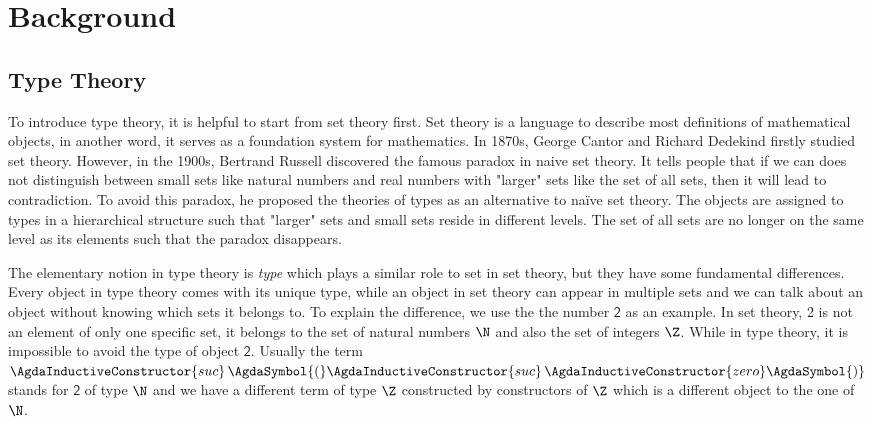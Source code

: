 \chapter{Background}
\label{tt}


\section{Type Theory}


To introduce type theory, it is helpful to start from set theory first. Set theory is a language to describe most definitions of mathematical objects, in another word, it serves as a foundation system for mathematics. 
In 1870s, George Cantor and Richard Dedekind firstly studied set theory. However, in the 1900s, Bertrand Russell discovered the famous paradox in naive set
theory. It tells people that if we can does not distinguish between small sets like natural numbers and real numbers with "larger" sets like the set of all sets, then it will lead to contradiction. To avoid this paradox, he
proposed the theories of types \cite{rus:1903} as an alternative to
naïve set theory. The objects are assigned to types in a hierarchical structure such that "larger" sets and small sets reside in different levels. The set of all
sets are no longer on the same level as its elements such that the
paradox disappears. 

The elementary notion in type theory is \emph{type} which plays a similar role to set in set theory, but they have some fundamental differences. Every object in type theory comes with its unique type, while an object in set theory can appear in multiple sets and we can talk about an object without knowing which sets it belongs to.
To explain the difference, we use the the number $\mathsf{2}$ as an example. In set theory, 2 is not an element of only one specific set, it belongs to the set of natural numbers $\N$ and also the set of integers $\Z$. While in type
theory, it is impossible to avoid the type of object $\mathsf{2}$. Usually the term $\AgdaInductiveConstructor{suc} \, \AgdaSymbol{(}\AgdaInductiveConstructor{suc} \, \AgdaInductiveConstructor{zero}\AgdaSymbol{)}$ stands for $\mathsf{2}$ of type $\N$ and we have a different term of type $\Z$ constructed by constructors of $\Z$ which is a different object to the one of $\N$. 



